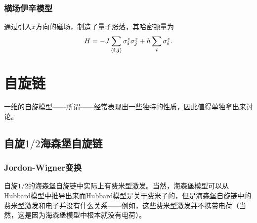 \subsection{横场伊辛模型}

通过引入$x$方向的磁场，制造了量子涨落，其哈密顿量为
\begin{equation}
    H = - J \sum_{\langle \vb*{i}, \vb*{j} \rangle} \sigma^z_{\vb*{i}} \sigma^x_{\vb*{j}} + h \sum_{\vb*{i}} \sigma^z_{\vb*{i}}.
\end{equation}

\chapter{自旋链}

一维的自旋模型——所谓——经常表现出一些独特的性质，因此值得单独拿出来讨论。

\section{自旋$1/2$海森堡自旋链}

\subsection{Jordon-Wigner变换}

自旋$1/2$的海森堡自旋链中实际上有费米型激发。当然，海森堡模型可以从Hubbard模型中推导出来而Hubbard模型是关于费米子的，但是海森堡自旋链中的费米型激发和电子并没有什么关系——例如，这些费米型激发并不携带电荷（当然，这是因为海森堡模型中根本就没有电荷）。

